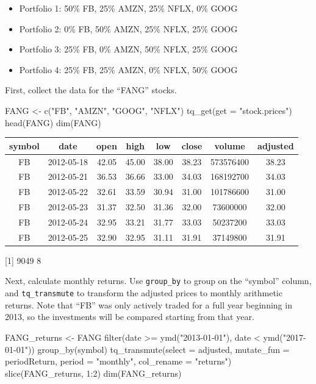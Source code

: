 \begin{itemize}
\tightlist
\item
  Portfolio 1: 50\% FB, 25\% AMZN, 25\% NFLX, 0\% GOOG
\item
  Portfolio 2: 0\% FB, 50\% AMZN, 25\% NFLX, 25\% GOOG
\item
  Portfolio 3: 25\% FB, 0\% AMZN, 50\% NFLX, 25\% GOOG
\item
  Portfolio 4: 25\% FB, 25\% AMZN, 0\% NFLX, 50\% GOOG
\end{itemize}

First, collect the data for the ``FANG'' stocks.

\begin{Schunk}
\begin{Sinput}
FANG <- c("FB", "AMZN", "GOOG", "NFLX") %
    tq_get(get = "stock.prices")
head(FANG)
dim(FANG)
\end{Sinput}
\end{Schunk}

\begin{tabular}{cccccccc}
\toprule
symbol & date & open & high & low & close & volume & adjusted\\
\midrule
FB & 2012-05-18 & 42.05 & 45.00 & 38.00 & 38.23 & 573576400 & 38.23\\
FB & 2012-05-21 & 36.53 & 36.66 & 33.00 & 34.03 & 168192700 & 34.03\\
FB & 2012-05-22 & 32.61 & 33.59 & 30.94 & 31.00 & 101786600 & 31.00\\
FB & 2012-05-23 & 31.37 & 32.50 & 31.36 & 32.00 & 73600000 & 32.00\\
FB & 2012-05-24 & 32.95 & 33.21 & 31.77 & 33.03 & 50237200 & 33.03\\
FB & 2012-05-25 & 32.90 & 32.95 & 31.11 & 31.91 & 37149800 & 31.91\\
\bottomrule
\end{tabular}

{[}1{]} 9049 8

\hspace{20 mm}

Next, calculate monthly returns. Use \texttt{group\_by} to group on the
``symbol'' column, and \texttt{tq\_transmute} to transform the adjusted
prices to monthly arithmetic returns. Note that ``FB'' was only actively
traded for a full year beginning in 2013, so the investments will be
compared starting from that year.

\begin{Schunk}
\begin{Sinput}
FANG_returns <- FANG %
    filter(date >= ymd("2013-01-01"),
           date <  ymd("2017-01-01")) %
    group_by(symbol) %
    tq_transmute(select     = adjusted,
                 mutate_fun = periodReturn,
                 period     = "monthly",
                 col_rename = "returns")
slice(FANG_returns, 1:2)
dim(FANG_returns)
\end{Sinput}
\end{Schunk}

